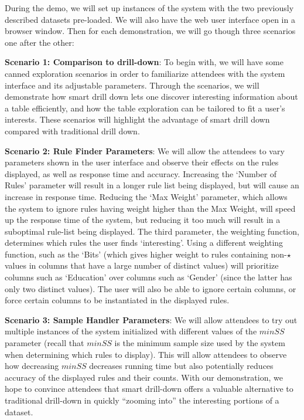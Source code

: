 During the demo, we will set up instances of the system with the two previously described datasets pre-loaded. We will also have the web user interface open in a browser window. Then for each demonstration, we will go though three scenarios one after the other:
\squishlist
\item {\bf Scenario 1: Comparison to drill-down}: To begin with, we will have some canned exploration scenarios in order to familiarize attendees with the system interface and its adjustable parameters. Through the scenarios, we will demonstrate how smart drill down lets one discover interesting information about a table efficiently, and how the table exploration can be tailored to fit a user's interests. These scenarios will highlight the advantage of smart drill down compared with traditional drill down. 
\item {\bf Scenario 2: Rule Finder Parameters}: We will allow the attendees to vary parameters shown in the user interface and observe their effects on the rules displayed, as well as response time and accuracy. Increasing the `Number of Rules' parameter will result in a longer rule list being displayed, but will cause an increase in response time. Reducing the `Max Weight' parameter, which allows the system to ignore rules having weight higher than the Max Weight, will speed up the response time of the system, but reducing it too much will result in a suboptimal rule-list being displayed. The third parameter, the weighting function, determines which rules the user finds `interesting'. Using a different weighting function, such as the `Bits' (which gives higher weight to rules containing non-$\star$ values in columns that have a large number of distinct values) will prioritize columns such as `Education' over columns such as `Gender' (since the latter has only two distinct values). The user will also be able to ignore certain columns, or force certain columns to be instantiated in the displayed rules. 
\item {\bf Scenario 3: Sample Handler Parameters}: We will allow attendees to try out multiple instances of the system initialized with different values of the $minSS$  parameter (recall that $minSS$ is the minimum sample size used by the system when determining which rules to display). This will allow attendees to observe how decreasing $minSS$ decreases running time but also potentially reduces accuracy of the displayed rules and their counts.
\squishend
\noindent With our demonstration, we hope to convince attendees that smart drill-down offers
a valuable alternative to traditional drill-down in quickly ``zooming into'' the interesting portions of a dataset.